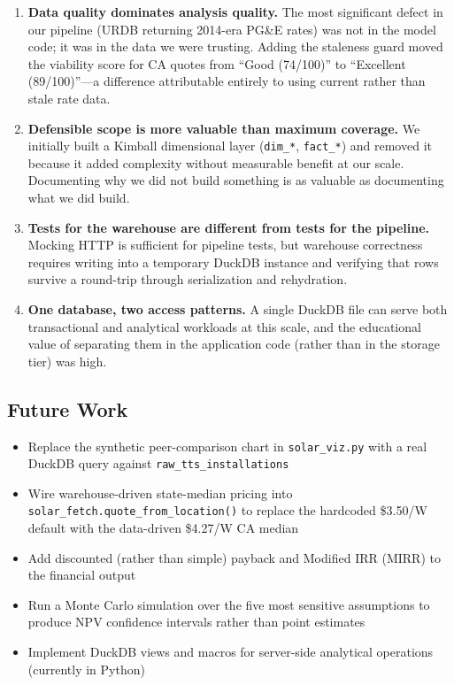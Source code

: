 \documentclass[10pt, conference]{IEEEtran}
\begin{document}
\begin{enumerate}
\item \textbf{Data quality dominates analysis quality.} The most significant defect in our pipeline (URDB returning 2014-era PG\&E rates) was not in the model code; it was in the data we were trusting. Adding the staleness guard moved the viability score for CA quotes from ``Good (74/100)'' to ``Excellent (89/100)''---a difference attributable entirely to using current rather than stale rate data.
\item \textbf{Defensible scope is more valuable than maximum coverage.} We initially built a Kimball dimensional layer (\texttt{dim\_*}, \texttt{fact\_*}) and removed it because it added complexity without measurable benefit at our scale. Documenting why we did not build something is as valuable as documenting what we did build.
\item \textbf{Tests for the warehouse are different from tests for the pipeline.} Mocking HTTP is sufficient for pipeline tests, but warehouse correctness requires writing into a temporary DuckDB instance and verifying that rows survive a round-trip through serialization and rehydration.
\item \textbf{One database, two access patterns.} A single DuckDB file can serve both transactional and analytical workloads at this scale, and the educational value of separating them in the application code (rather than in the storage tier) was high.
\end{enumerate}

\subsection{Future Work}

\begin{itemize}
\item Replace the synthetic peer-comparison chart in \texttt{solar\_viz.py} with a real DuckDB query against \texttt{raw\_tts\_installations}
\item Wire warehouse-driven state-median pricing into \texttt{solar\_fetch.quote\_from\_location()} to replace the hardcoded \$3.50/W default with the data-driven \$4.27/W CA median
\item Add discounted (rather than simple) payback and Modified IRR (MIRR) to the financial output
\item Run a Monte Carlo simulation over the five most sensitive assumptions to produce NPV confidence intervals rather than point estimates
\item Implement DuckDB views and macros for server-side analytical operations (currently in Python)
\end{itemize}
\end{document}

